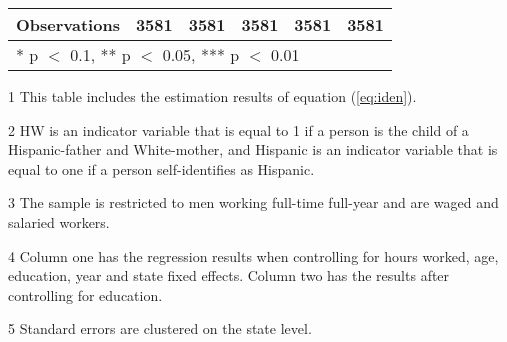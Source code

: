 \begin{table}[H]
\begin{threeparttable}
\begin{tabular}[t]{lccccc}
Observations & \num{3581} & \num{3581} & \num{3581} & \num{3581} & \num{3581}\\
\bottomrule
\multicolumn{6}{l}{\rule{0pt}{1em}* p $<$ 0.1, ** p $<$ 0.05, *** p $<$ 0.01}\\
\end{tabular}
\begin{tablenotes}
\item[1] \footnotesize{This table includes the estimation results of equation (\ref{eq:iden}).}
\item[2] \footnotesize{HW is an indicator variable that is equal to 1 if a person is the child of a Hispanic-father and White-mother, and Hispanic is an indicator variable that is equal to one if a person self-identifies as Hispanic.}
\item[3] \footnotesize{The sample is restricted to men working full-time full-year and are waged and salaried workers.}
\item[4] \footnotesize{Column one has the regression results when controlling for hours worked, age, education, year and state fixed effects. Column two has the results after controlling for education.}
\item[5] {\footnotesize{Standard errors are clustered on the state level.}}
\end{tablenotes}
\end{threeparttable}
\end{table}
